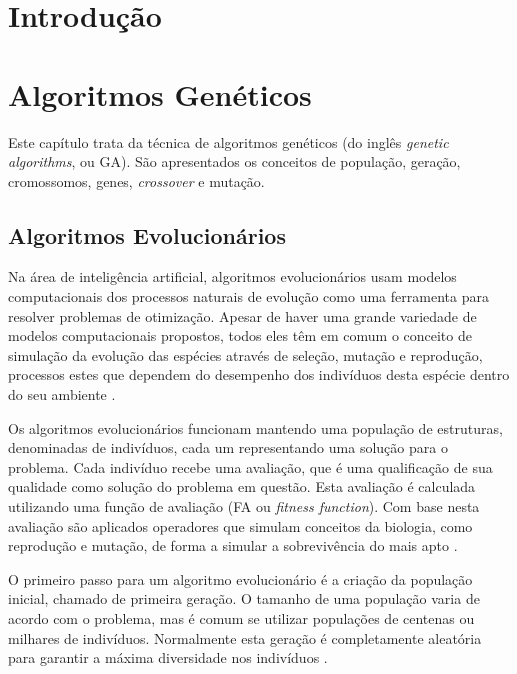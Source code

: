 \documentclass[12pt,oneside,a4paper,english,french,spanish,brazil,]{abntex2}
\begin{document}
\chapter{Introdução}

\chapter{Algoritmos Genéticos}

Este capítulo trata da técnica de algoritmos genéticos (do inglês \textit{genetic algorithms}, ou GA). São apresentados os conceitos de população, geração, cromossomos, genes, \textit{crossover} e mutação.

\section{Algoritmos Evolucionários}
\label{sec:que}
Na área de inteligência artificial, algoritmos evolucionários usam modelos computacionais dos processos naturais de evolução como uma ferramenta para resolver problemas de otimização. Apesar de haver uma grande variedade de modelos computacionais propostos, todos eles têm em comum o conceito de simulação da evolução das espécies através de seleção, mutação e reprodução, processos estes que dependem do desempenho dos indivíduos desta espécie dentro do seu ambiente \cite{linden:2008}.

Os algoritmos evolucionários funcionam mantendo uma população de estruturas, denominadas de indivíduos, cada um representando uma solução para o problema. Cada indivíduo recebe uma avaliação, que é uma qualificação de sua qualidade como solução do problema em questão. Esta avaliação é calculada utilizando uma função de avaliação (FA ou \textit{fitness function}). Com base nesta avaliação são aplicados operadores que simulam conceitos da biologia, como reprodução e mutação, de forma a simular a sobrevivência do mais apto \cite{linden:2008}.

O primeiro passo para um algoritmo evolucionário é a criação da população inicial, chamado de primeira geração. O tamanho de uma população varia de acordo com o problema, mas é comum se utilizar populações de centenas ou milhares de indivíduos. Normalmente esta geração é completamente aleatória para garantir a máxima diversidade nos indivíduos \cite{linden:2008}.
\end{document}
